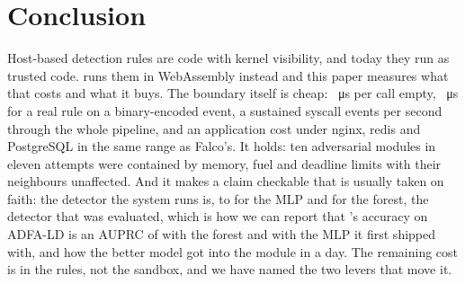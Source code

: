 \section{Conclusion}
\label{sec:conclusion}
Host-based detection rules are code with kernel visibility, and today they
run as trusted code. \sys runs them in WebAssembly instead and this paper
measures what that costs and what it buys. The boundary itself is cheap:
\eTwoEngineOverheadUs{}~\si{\micro\second} per call empty,
\eTwoMlRawUs{}~\si{\micro\second} for a real rule on a binary-encoded event,
a sustained \eThreeAchievedBinFiftyKRf{} syscall events per second through
the whole pipeline, and an application cost under nginx, redis and
PostgreSQL in the same range as Falco's. It holds: ten adversarial modules
in eleven attempts were contained by memory, fuel and deadline limits with
their neighbours unaffected. And it makes a claim checkable that is
usually taken on faith: the detector the system runs is, to
\eTwoMaxDiffNumpyWasm{} for the MLP and \eOneWasmSklearnMaxDiff{} for the
forest, the detector that was evaluated, which is how we can report that
\sys's accuracy on ADFA-LD is an AUPRC of \eOneAuprcRfWasm{} with the forest
and \eOneAuprcMlp{} with the MLP it first shipped with, and how the better
model got into the module in a day. The remaining cost is in the rules, not
the sandbox, and we have named the two levers that move it.
